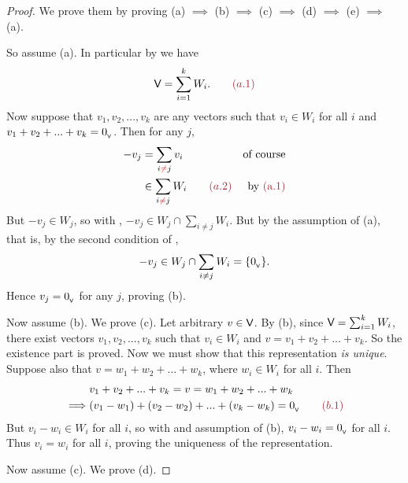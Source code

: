 \begin{proof}
We prove them by proving (a) \(\implies\) (b) \(\implies\) (c) \(\implies\) (d) \(\implies\) (e) \(\implies\) (a).

So assume (a).
In particular by  we have
\[
    \V = \sum_{i = 1}^k W_i. \quad \quad \MAROON{(a.1)}
\]
Now suppose that \(v_1, v_2, ..., v_k\) are any vectors such that \(v_i \in W_i\) for all \(i\) and \(v_1 + v_2 + ... + v_k = 0_{_{\textsf{V}}}\).
Then for any \(j\),
\begin{align*}
    -v_j & = \sum_{i \RED{\ne} j} v_i & \text{of course} \\
         & \in \sum_{i \RED{\ne} j} W_i \quad \quad \MAROON{(a.2)} & \text{by \MAROON{(a.1)}}
\end{align*}
But \(-v_j \in W_j\), so with , \(-v_j \in W_j \cap \sum_{i \ne j} W_i\).
But by the assumption of (a), that is, by the second condition of ,
\[
    -v_j \in W_j \cap \sum_{i \ne j} W_i = \{ 0_{_{\textsf{V}}} \}.
\]
Hence \(v_j = 0_{_{\textsf{V}}}\) for any \(j\), proving (b).

Now assume (b). We prove (c).
Let arbitrary \(v \in \textsf{V}\).
By (b), since \(\textsf{V} = \sum_{i = 1}^k W_i\), there exist vectors \(v_1, v_2, ..., v_k\) such that \(v_i \in W_i\) and \(v = v_1 + v_2 + ... + v_k\).
So the existence part is proved.
Now we must show that this representation \emph{is unique}. Suppose also that \(v = w_1 + w_2 + ... + w_k\), where \(w_i \in W_i\) for all \(i\).
Then
\begin{align*}
             & v_1 + v_2 + ... + v_k = v = w_1 + w_2 + ... + w_k \\
    \implies & (v_1 - w_1) + (v_2 - w_2) + ... + (v_k - w_k) = \OV \quad \quad \MAROON{(b.1)}
\end{align*}
But \(v_i - w_i \in W_i\) for all \(i\), so with  and assumption of (b), \(v_i - w_i = 0_{_{\textsf{V}}}\) for all \(i\).
Thus \(v_i = w_i\) for all \(i\), proving the uniqueness of the representation.

Now assume (c). We prove (d).


\end{proof}
